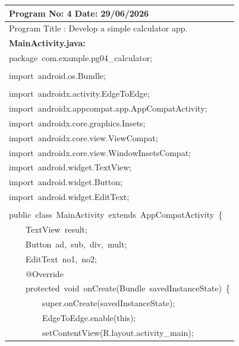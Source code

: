 \documentclass[a4paper,12pt]{article}
\begin{document}
\newpage

\noindent\begingroup
\renewcommand{\arraystretch}{1.1}
\begin{longtable}{|p{}|}
\hline\endfirsthead\hline\endhead\hline\endfoot\hline\endlastfoot
\rule{0pt}{13pt}Program No: 4 \hfill Date: 29/06/2026 \\
\hline
\rule{0pt}{13pt}Program Title : Develop a simple calculator app. \\
\hline
\rule{0pt}{13pt}\textbf{MainActivity.java:} \\
\hline
{\ttfamily\small package\ com.example.pg04\_calculator;} \\
\strut \\
{\ttfamily\small import\ android.os.Bundle;} \\
\strut \\
{\ttfamily\small import\ androidx.activity.EdgeToEdge;} \\
{\ttfamily\small import\ androidx.appcompat.app.AppCompatActivity;} \\
{\ttfamily\small import\ androidx.core.graphics.Insets;} \\
{\ttfamily\small import\ androidx.core.view.ViewCompat;} \\
{\ttfamily\small import\ androidx.core.view.WindowInsetsCompat;} \\
{\ttfamily\small import\ android.widget.TextView;} \\
{\ttfamily\small import\ android.widget.Button;} \\
{\ttfamily\small import\ android.widget.EditText;} \\
\strut \\
{\ttfamily\small public\ class\ MainActivity\ extends\ AppCompatActivity\ \{} \\
{\ttfamily\small \ \ \ \ TextView\ result;} \\
{\ttfamily\small \ \ \ \ Button\ ad,\ sub,\ div,\ mult;} \\
{\ttfamily\small \ \ \ \ EditText\ no1,\ no2;} \\
{\ttfamily\small \ \ \ \ @Override} \\
{\ttfamily\small \ \ \ \ protected\ void\ onCreate(Bundle\ savedInstanceState)\ \{} \\
{\ttfamily\small \ \ \ \ \ \ \ \ super.onCreate(savedInstanceState);} \\
{\ttfamily\small \ \ \ \ \ \ \ \ EdgeToEdge.enable(this);} \\
{\ttfamily\small \ \ \ \ \ \ \ \ setContentView(R.layout.activity\_main);} \\

\end{longtable}
\end{document}
